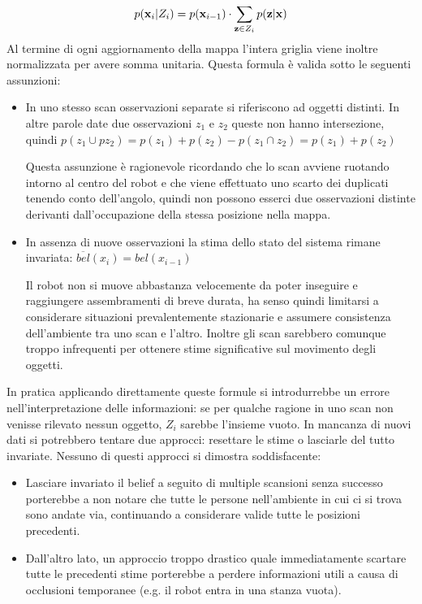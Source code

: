 \documentclass[a4paper]{article}
\begin{document}
	\begin{equation}\label{eq:belief-update}
		p({\bf x}_i | Z_i) = p({\bf x}_{i-1}) \cdot 
		\sum_{{\bf z} \in Z_i} p({\bf z} | {\bf x})
	\end{equation}
	Al termine di ogni aggiornamento della mappa l'intera griglia viene inoltre
	normalizzata per avere somma unitaria.  
	Questa formula è valida sotto le seguenti assunzioni:
	\begin{itemize}
		\item In uno stesso scan osservazioni separate si riferiscono ad
			oggetti distinti. In altre parole date due osservazioni $z_1$ e
			$z_2$ queste non hanno intersezione, quindi $ p(z_1 \cup pz_2) =
			p(z_1)+p(z_2)-p( z_1 \cap z_2) = p(z_1)+p(z_2) $ 

			Questa assunzione è ragionevole ricordando che lo scan avviene
			ruotando intorno al centro del robot e che viene effettuato uno
			scarto dei duplicati tenendo conto dell'angolo, quindi non possono
			esserci due osservazioni distinte derivanti dall'occupazione della
			stessa posizione nella mappa.

		\item In assenza di nuove osservazioni la stima dello stato del sistema
			rimane invariata: $ \overline{bel}(x_i) = bel(x_{i-1}) $ 

			Il robot non si muove abbastanza velocemente da poter inseguire e
			raggiungere assembramenti di breve durata, ha senso quindi
			limitarsi a considerare situazioni prevalentemente stazionarie e
			assumere consistenza dell'ambiente tra uno scan e l'altro. Inoltre
			gli scan sarebbero comunque troppo infrequenti per ottenere stime
			significative sul movimento degli oggetti.

	\end{itemize}

	In pratica applicando direttamente queste formule si introdurrebbe un
	errore nell'interpretazione delle informazioni: se per qualche ragione in
	uno scan non venisse rilevato nessun oggetto, $ Z_i $ sarebbe l'insieme
	vuoto. In mancanza di nuovi dati si potrebbero tentare due approcci:
	resettare le stime o lasciarle del tutto invariate. Nessuno di questi
	approcci si dimostra soddisfacente:
	\begin{itemize} 
		\item Lasciare invariato il belief a seguito di multiple scansioni
			senza successo porterebbe a non notare che tutte le persone
			nell'ambiente in cui ci si trova sono andate via, continuando a
			considerare valide tutte le posizioni precedenti.
		\item Dall'altro lato, un approccio troppo drastico quale
			immediatamente scartare tutte le precedenti stime porterebbe a
			perdere informazioni utili a causa di occlusioni temporanee (e.g.
			il robot entra in una stanza vuota).
	\end{itemize}
\end{document}
